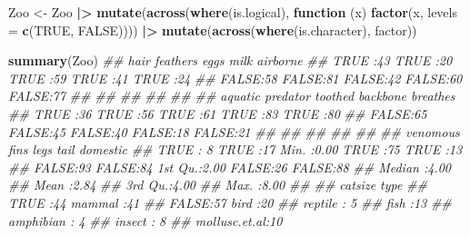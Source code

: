 \documentclass[
  notitlepage]{book}
\newenvironment{Shaded}{\begin{snugshade}}{\end{snugshade}}
\newcommand{\CommentTok}[1]{\textcolor[rgb]{0.56,0.35,0.01}{\textit{#1}}}
\newcommand{\ControlFlowTok}[1]{\textcolor[rgb]{0.13,0.29,0.53}{\textbf{#1}}}
\newcommand{\DataTypeTok}[1]{\textcolor[rgb]{0.13,0.29,0.53}{#1}}
\newcommand{\ErrorTok}[1]{\textcolor[rgb]{0.64,0.00,0.00}{\textbf{#1}}}
\newcommand{\KeywordTok}[1]{\textcolor[rgb]{0.13,0.29,0.53}{\textbf{#1}}}
\newcommand{\NormalTok}[1]{#1}
\newcommand{\OperatorTok}[1]{\textcolor[rgb]{0.81,0.36,0.00}{\textbf{#1}}}
\newcommand{\OtherTok}[1]{\textcolor[rgb]{0.56,0.35,0.01}{#1}}
\newcommand{\StringTok}[1]{\textcolor[rgb]{0.31,0.60,0.02}{#1}}
\begin{document}
\begin{Shaded}
\begin{Highlighting}[]
\NormalTok{Zoo \textless{}{-}}\StringTok{ }\NormalTok{Zoo }\OperatorTok{|}\ErrorTok{\textgreater{}}
\StringTok{  }\KeywordTok{mutate}\NormalTok{(}\KeywordTok{across}\NormalTok{(}\KeywordTok{where}\NormalTok{(is.logical), }
         \ControlFlowTok{function}\NormalTok{ (x) }\KeywordTok{factor}\NormalTok{(x, }\DataTypeTok{levels =} \KeywordTok{c}\NormalTok{(}\OtherTok{TRUE}\NormalTok{, }\OtherTok{FALSE}\NormalTok{)))) }\OperatorTok{|}\ErrorTok{\textgreater{}}
\StringTok{  }\KeywordTok{mutate}\NormalTok{(}\KeywordTok{across}\NormalTok{(}\KeywordTok{where}\NormalTok{(is.character), factor))}

\KeywordTok{summary}\NormalTok{(Zoo)}
\CommentTok{\#\#     hair     feathers     eggs       milk     airborne }
\CommentTok{\#\#  TRUE :43   TRUE :20   TRUE :59   TRUE :41   TRUE :24  }
\CommentTok{\#\#  FALSE:58   FALSE:81   FALSE:42   FALSE:60   FALSE:77  }
\CommentTok{\#\#                                                        }
\CommentTok{\#\#                                                        }
\CommentTok{\#\#                                                        }
\CommentTok{\#\#                                                        }
\CommentTok{\#\#                                                        }
\CommentTok{\#\#   aquatic    predator   toothed    backbone   breathes }
\CommentTok{\#\#  TRUE :36   TRUE :56   TRUE :61   TRUE :83   TRUE :80  }
\CommentTok{\#\#  FALSE:65   FALSE:45   FALSE:40   FALSE:18   FALSE:21  }
\CommentTok{\#\#                                                        }
\CommentTok{\#\#                                                        }
\CommentTok{\#\#                                                        }
\CommentTok{\#\#                                                        }
\CommentTok{\#\#                                                        }
\CommentTok{\#\#   venomous     fins         legs         tail     domestic }
\CommentTok{\#\#  TRUE : 8   TRUE :17   Min.   :0.00   TRUE :75   TRUE :13  }
\CommentTok{\#\#  FALSE:93   FALSE:84   1st Qu.:2.00   FALSE:26   FALSE:88  }
\CommentTok{\#\#                        Median :4.00                        }
\CommentTok{\#\#                        Mean   :2.84                        }
\CommentTok{\#\#                        3rd Qu.:4.00                        }
\CommentTok{\#\#                        Max.   :8.00                        }
\CommentTok{\#\#                                                            }
\CommentTok{\#\#   catsize              type   }
\CommentTok{\#\#  TRUE :44   mammal       :41  }
\CommentTok{\#\#  FALSE:57   bird         :20  }
\CommentTok{\#\#             reptile      : 5  }
\CommentTok{\#\#             fish         :13  }
\CommentTok{\#\#             amphibian    : 4  }
\CommentTok{\#\#             insect       : 8  }
\CommentTok{\#\#             mollusc.et.al:10}
\end{Highlighting}
\end{Shaded}
\end{document}
